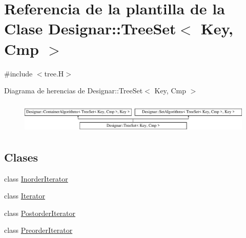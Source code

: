\hypertarget{class_designar_1_1_tree_set}{}\section{Referencia de la plantilla de la Clase Designar\+:\+:Tree\+Set$<$ Key, Cmp $>$}
\label{class_designar_1_1_tree_set}


{\ttfamily \#include $<$tree.\+H$>$}

Diagrama de herencias de Designar\+:\+:Tree\+Set$<$ Key, Cmp $>$\begin{figure}[H]
\begin{center}
\leavevmode
\includegraphics[height=1.513514cm]{class_designar_1_1_tree_set}
\end{center}
\end{figure}
\subsection*{Clases}
\begin{DoxyCompactItemize}
\item 
class \hyperlink{class_designar_1_1_tree_set_1_1_inorder_iterator}{Inorder\+Iterator}
\item 
class \hyperlink{class_designar_1_1_tree_set_1_1_iterator}{Iterator}
\item 
class \hyperlink{class_designar_1_1_tree_set_1_1_postorder_iterator}{Postorder\+Iterator}
\item 
class \hyperlink{class_designar_1_1_tree_set_1_1_preorder_iterator}{Preorder\+Iterator}
\end{DoxyCompactItemize}
